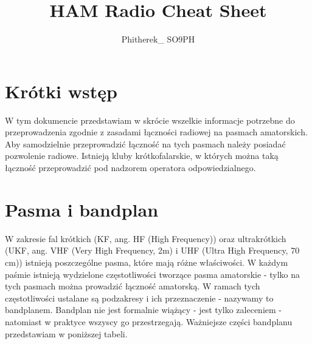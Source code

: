 \documentclass[a4paper,11pt]{article}
\author{Phitherek\_ SO9PH}
\title{HAM Radio Cheat Sheet}
\begin{document}
\maketitle
\section{Krótki wstęp}
W tym dokumencie przedstawiam w skrócie wszelkie informacje potrzebne do przeprowadzenia zgodnie z zasadami łączności radiowej na pasmach amatorskich. Aby samodzielnie przeprowadzić łączność na tych pasmach należy posiadać pozwolenie radiowe. Istnieją kluby krótkofalarskie, w których można taką łączność przeprowadzić pod nadzorem operatora odpowiedzialnego.
\section{Pasma i bandplan}
W zakresie fal krótkich (KF, ang. HF (High Frequency)) oraz ultrakrótkich (UKF, ang. VHF (Very High Frequency, 2m) i UHF (Ultra High Frequency, 70 cm)) istnieją poszczególne pasma, które mają różne właściwości. W każdym paśmie istnieją wydzielone częstotliwości tworzące pasma amatorskie - tylko na tych pasmach można prowadzić łączność amatorską. W ramach tych częstotliwości ustalane są podzakresy i ich przeznaczenie - nazywamy to bandplanem. Bandplan nie jest formalnie wiążący - jest tylko zaleceniem - natomiast w praktyce wszyscy go przestrzegają. Ważniejsze części bandplanu przedstawiam w poniższej tabeli.
\end{document}
